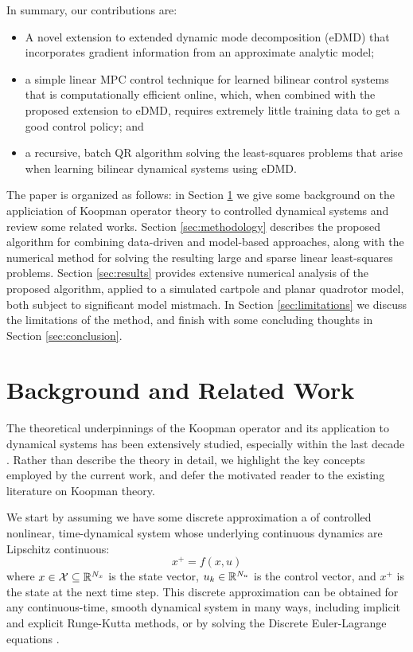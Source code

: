 \documentclass{article}
\begin{document}
In summary, our contributions are:
\begin{itemize}
  \item A novel extension to extended dynamic mode decomposition (eDMD) that
  incorporates gradient information from an approximate analytic model;
  
  \item a simple linear MPC control technique for learned bilinear control systems
  that is computationally efficient online, which, when combined with the proposed
  extension to eDMD, requires extremely little training data to get a good control
  policy; and
  
  \item a recursive, batch QR algorithm solving the least-squares problems that arise 
  when learning bilinear dynamical systems using eDMD.
\end{itemize}

The paper is organized as follows: in Section \ref{sec:Preliminaries/Background} we 
give some background on the appliciation of Koopman operator theory to controlled 
dynamical systems and review some related works. Section \ref{sec:methodology} describes
the proposed algorithm for combining data-driven and model-based approaches, along with 
the numerical method for solving the resulting large and sparse linear least-squares 
problems. Section \ref{sec:results} provides extensive numerical analysis of the 
proposed algorithm, applied to a simulated cartpole and planar quadrotor model, both 
subject to significant model mistmach. In Section \ref{sec:limitations} we discuss the 
limitations of the method, and finish with some concluding thoughts in Section 
\ref{sec:conclusion}.

\section{Background and Related Work} \label{sec:Preliminaries/Background}

The theoretical underpinnings of the Koopman operator and its application to dynamical
systems has been extensively studied, especially within the last decade 
\cite{Fasel2021,Proctor2018,Bruder2021,Williams2015}. Rather than describe the theory in
detail, we highlight the key concepts employed by the current work, and defer the
motivated reader to the existing literature on Koopman theory.

We start by assuming we have some discrete approximation a of controlled nonlinear,
time-dynamical system whose underlying continuous dynamics are Lipschitz continuous:
\begin{equation} \label{eq:discrete_dynamics} 
  x^+ = f(x, u) 
\end{equation} 
where $x \in \mathcal{X} \subseteq \mathbb{R}^{N_x}$ is the state vector, $u_k \in \mathbb{R}^{N_u}$ is
the control vector, and $x^+$ is the state at the next time step. This discrete
approximation can be obtained for any continuous-time, smooth dynamical system in many
ways, including implicit and explicit Runge-Kutta methods, or by solving the Discrete
Euler-Lagrange equations \cite{Brudigam2021a,Brudigam2021,Howell2022}.
\end{document}
